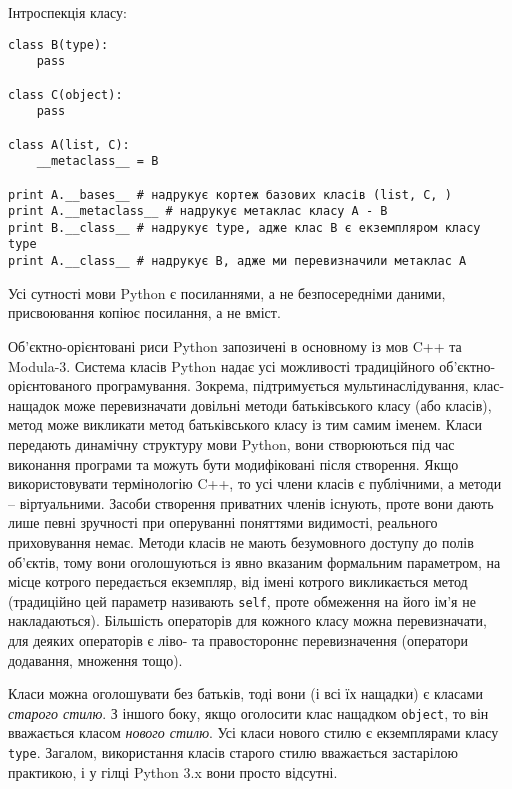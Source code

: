 \documentclass[a4paper, 12pt, onsedie]{article}
\begin{document}
Інтроспекція класу:

\begin{verbatim}
class B(type):
    pass

class C(object):
    pass

class A(list, C):
    __metaclass__ = B

print A.__bases__ # надрукує кортеж базових класів (list, C, )
print A.__metaclass__ # надрукує метаклас класу A - B
print B.__class__ # надрукує type, адже клас B є екземпляром класу type
print A.__class__ # надрукує B, адже ми перевизначили метаклас A
\end{verbatim}

Усі сутності мови Python є посиланнями, а не
безпосередніми даними, присвоювання копіює посилання, а не вміст. 

Об'єктно-орієнтовані риси Python запозичені в основному із мов C++ та Modula-3. Система 
класів Python надає усі можливості традиційного об'єктно-орієнтованого програмування.
Зокрема, підтримується мультинаслідування, клас-нащадок може перевизначати довільні методи 
батьківського класу (або класів), метод може викликати метод батьківського класу із тим 
самим іменем. Класи передають динамічну структуру мови Python, вони створюються під час 
виконання програми та можуть бути модифіковані після створення. Якщо використовувати 
термінологію C++, то усі члени класів є публічними, а методи -- віртуальними. Засоби 
створення приватних членів існують, проте вони дають лише певні зручності при оперуванні 
поняттями видимості, реального приховування немає. Методи класів не мають безумовного 
доступу до полів об'єктів, тому вони оголошуються із явно вказаним формальним параметром, 
на місце котрого передається екземпляр, від імені котрого викликається метод (традиційно
цей параметр називають \texttt{self}, проте обмеження на його ім'я не накладаються).
Більшість 
операторів для кожного класу можна перевизначати, для деяких операторів є ліво- та 
правостороннє перевизначення (оператори додавання, множення тощо).

Класи можна оголошувати без батьків, тоді вони (і всі їх нащадки) є класами 
\emph{старого стилю}. З іншого боку, якщо оголосити клас нащадком \texttt{object}, то він 
вважається класом \emph{нового стилю}. Усі класи нового стилю є екземплярами класу 
\texttt{type}. Загалом, використання класів старого стилю вважається застарілою практикою,
і у гілці Python 3.x вони просто відсутні.
\end{document}
